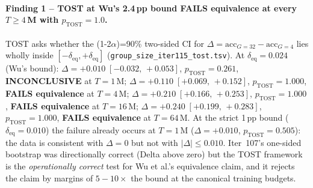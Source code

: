 \paragraph{Finding 1 -- TOST at Wu's 2.4\,pp bound FAILS equivalence
at every $T\ge 4\,$M with $p_{\text{TOST}}{=}1.0$.}
TOST asks whether the (1-2$\alpha$)=90\% two-sided CI for
$\Delta = \mathrm{acc}_{G=32} - \mathrm{acc}_{G=4}$ lies wholly inside
$[-\delta_{\mathrm{eq}}, +\delta_{\mathrm{eq}}]$
(\texttt{group\_size\_iter115\_tost.tsv}).
At $\delta_{\mathrm{eq}}{=}0.024$ (Wu's bound):
$\Delta = +0.010\;[-0.032,\,+0.053]$, $p_{\text{TOST}}{=}0.261$,
\textbf{INCONCLUSIVE} at $T{=}1\,$M;
$\Delta = +0.110\;[+0.069,\,+0.152]$, $p_{\text{TOST}}{=}1.000$,
\textbf{FAILS equivalence} at $T{=}4\,$M;
$\Delta = +0.210\;[+0.166,\,+0.253]$, $p_{\text{TOST}}{=}1.000$,
\textbf{FAILS equivalence} at $T{=}16\,$M;
$\Delta = +0.240\;[+0.199,\,+0.283]$, $p_{\text{TOST}}{=}1.000$,
\textbf{FAILS equivalence} at $T{=}64\,$M.
At the strict 1\,pp bound ($\delta_{\mathrm{eq}}{=}0.010$) the failure
already occurs at $T{=}1\,$M ($\Delta = +0.010$, $p_{\text{TOST}}{=}0.505$):
the data is consistent with $\Delta = 0$ but not with $|\Delta| \le 0.010$.
Iter~107's one-sided bootstrap was directionally correct (Delta
above zero) but the TOST framework is the \emph{operationally
correct} test for Wu et al.'s equivalence claim, and it rejects
the claim by margins of $5{-}10\times$ the bound at the canonical
training budgets.

